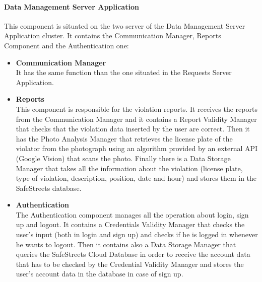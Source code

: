 \documentclass[titlepage]{article}
\begin{document}
\paragraph{Data Management Server Application}
This component is situated on the two server of the Data Management Server Application cluster. It contains the Communication Manager, Reports Component and the Authentication one:
\begin{itemize}

\item \textbf{Communication Manager}\\
It has the same function than the one situated in the Requests Server Application.

\item \textbf{Reports}\\
This component is responsible for the violation reports. It receives the reports from the Communication Manager and it contains a Report Validity Manager that checks that the violation data inserted by the user are correct. Then it has the Photo Analysis Manager that retrieves the license plate of the violator from the photograph using an algorithm provided by an external API (Google Vision) that scans the photo. Finally there is a Data Storage Manager that takes all the information about the violation (license plate, type of violation, description, position, date and hour) and stores them in the SafeStreets database.

\item \textbf{Authentication}\\
The Authentication component manages all the operation about login, sign up and logout.
It contains a Credentials Validity Manager that checks the user's input (both in login and sign up) and checks if he is logged in whenever he wants to logout. Then it contains also a Data Storage Manager that queries the SafeStreets Cloud Database in order to receive the account data that has to be checked by the Credential Validity Manager and stores the user's account data in the database in case of sign up.
\end{itemize}
\end{document}
